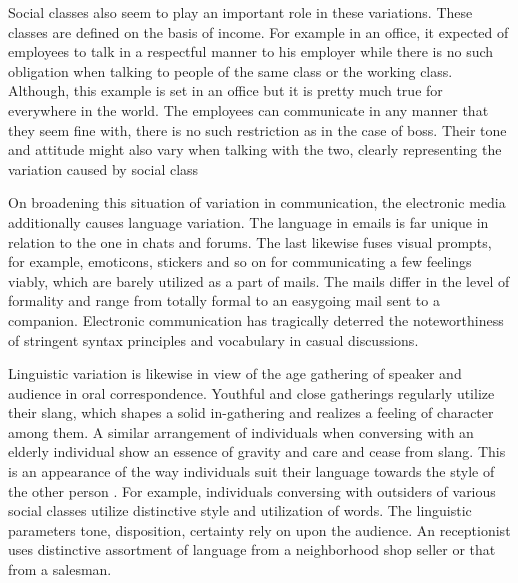 \documentclass[12pt, a4paper]{article}
\begin{document}
 Social classes also seem to play an important role in these variations. These classes are defined on the basis of income. For example in an office, it expected of employees to talk in a respectful manner to his employer while there is no such obligation when talking to people of the same class or the working class. Although, this example is set in an office but it is pretty much true for everywhere in the world. The employees can communicate in any manner that they seem fine with, there is no such restriction as in the case of boss. Their tone and attitude might also vary when talking with the two, clearly representing the variation caused by social class \\ \par
 
 On broadening this situation of variation in communication, the electronic media additionally causes language variation. The language in emails is far unique in relation to the one in chats and forums. The last likewise fuses visual prompts, for example, emoticons, stickers and so on for communicating a few feelings viably, which are barely utilized as a part of mails. The mails differ in the level of formality and range from totally formal to an easygoing mail sent to a companion. Electronic communication  has tragically deterred the noteworthiness of stringent syntax principles and vocabulary in casual discussions. \\ \par
 
 Linguistic variation is likewise in view of the age gathering of speaker and audience in oral correspondence. Youthful and close gatherings regularly utilize their slang, which shapes a solid in-gathering and realizes a feeling of character among them. A similar arrangement of individuals when conversing with an elderly individual show an essence of gravity and care and cease from slang. This is an appearance of the way individuals suit their language towards the style of the other person . For example, individuals conversing with outsiders of various social classes utilize distinctive style and utilization of words. The linguistic parameters tone, disposition, certainty rely on upon the audience. An receptionist uses distinctive assortment of language from a neighborhood shop seller or that from a salesman.\\ \par
 
 
\end{document}
